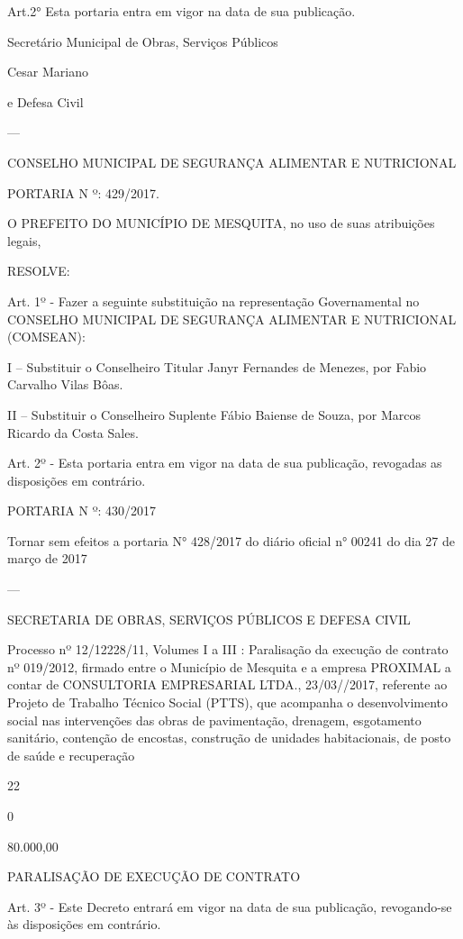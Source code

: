 \documentclass{doliberto}
\begin{document}
Art.2°  Esta  portaria  entra  em  vigor  na  data  de  sua 
publicação. 
 

Secretário Municipal de Obras, Serviços Públicos 

Cesar Mariano 

e Defesa Civil

---

CONSELHO  MUNICIPAL  DE  SEGURANÇA  ALIMENTAR  E 
NUTRICIONAL 

PORTARIA N º: 429/2017.      

O  PREFEITO  DO  MUNICÍPIO  DE  MESQUITA,  no  uso  de 
suas atribuições legais,  

RESOLVE:  

Art.  1º  -  Fazer  a  seguinte  substituição  na  representação 
Governamental no CONSELHO MUNICIPAL DE SEGURANÇA 
ALIMENTAR E NUTRICIONAL (COMSEAN):  

I  –  Substituir  o  Conselheiro  Titular  Janyr  Fernandes  de 
Menezes, por Fabio Carvalho Vilas Bôas.  

II  –  Substituir  o  Conselheiro  Suplente  Fábio  Baiense  de 
Souza, por Marcos Ricardo da Costa Sales. 

Art.  2º  -  Esta  portaria  entra  em  vigor  na  data  de  sua 
publicação, revogadas as disposições em contrário.  

PORTARIA N º: 430/2017 

Tornar sem efeitos a portaria N° 428/2017 do diário oficial 
n° 00241 do dia 27 de março de 2017 

---

SECRETARIA DE OBRAS, SERVIÇOS PÚBLICOS E DEFESA 
CIVIL 

Processo nº 12/12228/11, Volumes I a III : Paralisação da 
execução  de  contrato  nº  019/2012,  firmado  entre  o 
Município  de  Mesquita  e  a  empresa 
  PROXIMAL 
  a  contar  de 
CONSULTORIA  EMPRESARIAL  LTDA., 
23/03//2017,  referente  ao  Projeto  de  Trabalho  Técnico 
Social  (PTTS),  que  acompanha  o  desenvolvimento  social 
nas  intervenções  das    obras  de  pavimentação,  drenagem, 
esgotamento  sanitário,  contenção  de  encostas,  construção 
de unidades habitacionais, de posto de saúde e recuperação 

22 

0 

80.000,00 

PARALISAÇÃO DE EXECUÇÃO DE CONTRATO 

Art.  3º  -  Este  Decreto  entrará  em  vigor  na  data  de  sua 
publicação,  revogando-se  às  disposições  em  contrário. 
 
\end{document}
